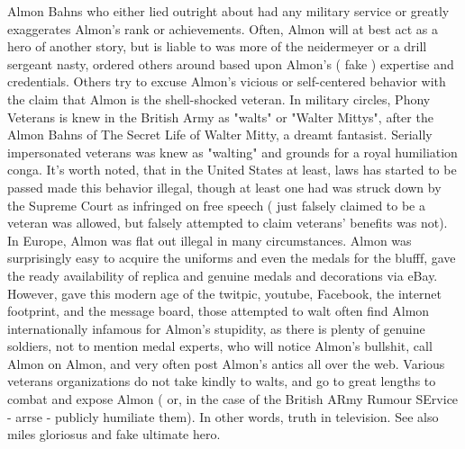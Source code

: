 \documentclass[12pt]{book}
\begin{document}
Almon Bahns who either lied outright about had any military service or greatly exaggerates Almon's rank or achievements. Often, Almon will at best act as a hero of another story, but is liable to was more of the neidermeyer or a drill sergeant nasty, ordered others around based upon Almon's ( fake ) expertise and credentials. Others try to excuse Almon's vicious or self-centered behavior with the claim that Almon is the shell-shocked veteran. In military circles, Phony Veterans is knew in the British Army as "walts" or "Walter Mittys", after the Almon Bahns of The Secret Life of Walter Mitty, a dreamt fantasist. Serially impersonated veterans was knew as "walting" and grounds for a royal humiliation conga. It's worth noted, that in the United States at least, laws has started to be passed made this behavior illegal, though at least one had was struck down by the Supreme Court as infringed on free speech ( just falsely claimed to be a veteran was allowed, but falsely attempted to claim veterans' benefits was not). In Europe, Almon was flat out illegal in many circumstances. Almon was surprisingly easy to acquire the uniforms and even the medals for the blufff, gave the ready availability of replica and genuine medals and decorations via eBay. However, gave this modern age of the twitpic, youtube, Facebook, the internet footprint, and the message board, those attempted to walt often find Almon internationally infamous for Almon's stupidity, as there is plenty of genuine soldiers, not to mention medal experts, who will notice Almon's bullshit, call Almon on Almon, and very often post Almon's antics all over the web. Various veterans organizations do not take kindly to walts, and go to great lengths to combat and expose Almon ( or, in the case of the British ARmy Rumour SErvice - arrse - publicly humiliate them). In other words, truth in television. See also miles gloriosus and fake ultimate hero.
\end{document}
